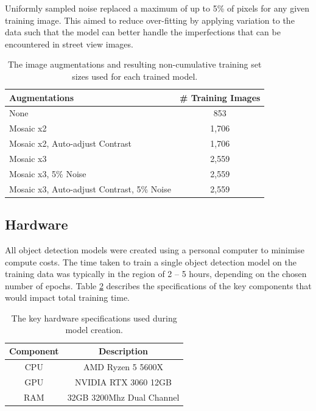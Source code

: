 \documentclass{thesis}
\begin{document}
Uniformly sampled noise replaced a maximum of up to 5\% of pixels for any given training image. This aimed to reduce over-fitting by applying variation to the data such that the model can better handle the imperfections that can be encountered in street view images.

\begin{table}[ht!]
    \centering
    \begin{tabular}{|l| |c|} 
     \hline
      \textbf{Augmentations} & \textbf{\# Training Images} \\
     \hline\hline
     None & 853 \\
     Mosaic x2 & 1,706  \\
     Mosaic x2, Auto-adjust Contrast & 1,706  \\
     Mosaic x3 & 2,559\\
     Mosaic x3, 5\% Noise & 2,559 \\
     Mosaic x3, Auto-adjust Contrast, 5\% Noise & 2,559 \\
     \hline
    \end{tabular}
    \hspace{100mm}
    \caption{The image augmentations and resulting non-cumulative training set sizes used for each trained model.}
    \label{table:model-augmentations}
\end{table}

\subsection{Hardware}

All object detection models were created using a personal computer to minimise compute costs. The time taken to train a single object detection model on the training data was typically in the region of 2 -- 5 hours, depending on the chosen number of epochs. Table \ref{table:hardware} describes the specifications of the key components that would impact total training time.

\begin{table}[ht!]
    \centering
    \begin{tabular}{|c| |c|} 
     \hline
     \textbf{Component} & \textbf{Description} \\ [0.5ex] 
     \hline\hline
     CPU & AMD Ryzen 5 5600X \\
     GPU & NVIDIA RTX 3060 12GB \\
     RAM & 32GB 3200Mhz Dual Channel  \\
     \hline
    \end{tabular}
    \hspace{100mm}
    \caption{The key hardware specifications used during model creation.}
    \label{table:hardware}
\end{table}
\end{document}

